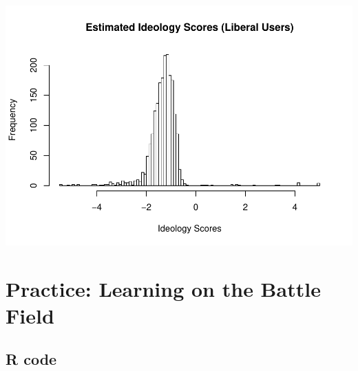 \documentclass[]{book}
\begin{document}
\includegraphics{bookdown-demo_files/figure-latex/unnamed-chunk-30-3.pdf}

\chapter{Practice: Learning on the Battle
Field}\label{practice-learning-on-the-battle-field}

\section{R code}\label{r-code}
\end{document}
